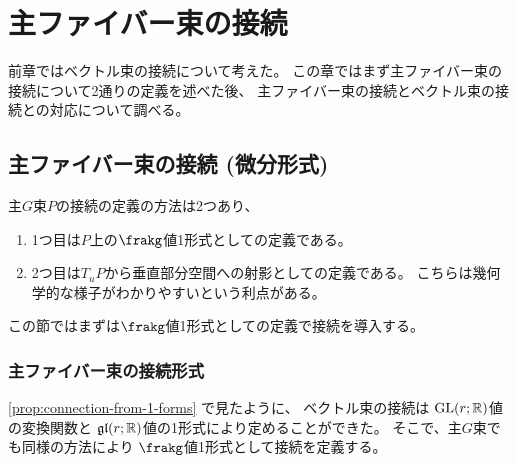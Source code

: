 \documentclass[report]{jlreq}
\begin{document}
%
\chapter{主ファイバー束の接続}

前章ではベクトル束の接続について考えた。
この章ではまず主ファイバー束の接続について2通りの定義を述べた後、
主ファイバー束の接続とベクトル束の接続との対応について調べる。

%
\section{主ファイバー束の接続 (微分形式)}

主$G$束$P$の接続の定義の方法は2つあり、
\begin{enumerate}
    \item 1つ目は$P$上の$\frakg$値1形式としての定義である。
    \item 2つ目は$T_u P$から垂直部分空間への射影としての定義である。
        こちらは幾何学的な様子がわかりやすいという利点がある。
\end{enumerate}
この節ではまずは$\frakg$値1形式としての定義で接続を導入する。

\subsection{主ファイバー束の接続形式}

\cref{prop:connection-from-1-forms} で見たように、
ベクトル束の接続は
$\operatorname{\mathrm{GL}}(r; \mathbb{R})$値の変換関数と
$\mathfrak{gl}(r; \mathbb{R})$値の1形式により定めることができた。
そこで、主$G$束でも同様の方法により
$\frakg$値1形式として接続を定義する。

\end{document}
